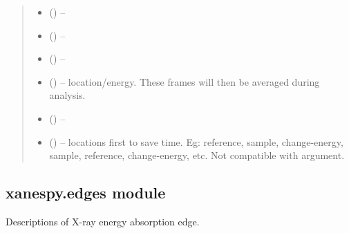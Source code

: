 \documentclass[letterpaper,10pt,english]{sphinxmanual}
\begin{document}
\begin{fulllineitems}
\begin{quote}
\begin{description}
\begin{itemize}
\item {} 
 (\sphinxstyleliteralemphasis{-}) -- 

\item {} 
 (\sphinxstyleliteralemphasis{-}) -- 

\item {} 
 (\sphinxstyleliteralemphasis{-}) -- 

\item {} 
 (\sphinxstyleliteralemphasis{-}) -- location/energy. These frames will then be averaged during
analysis.

\item {} 
 (\sphinxstyleliteralemphasis{-}) -- 

\item {} 
 (\sphinxstyleliteralemphasis{-}) -- locations first to save time. Eg: reference, sample,
change-energy, sample, reference, change-energy, etc. Not
compatible with  argument.

\end{itemize}

\end{description}\end{quote}

\end{fulllineitems}


\begin{fulllineitems}
\label{\detokenize{xanespy:xanespy.beamlines.write_scaninfo_header}}
\end{fulllineitems}



\subsection{xanespy.edges module}
\label{\detokenize{xanespy:module-xanespy.edges}}\label{\detokenize{xanespy:xanespy-edges-module}}
Descriptions of X-ray energy absorption edge.
\end{document}
